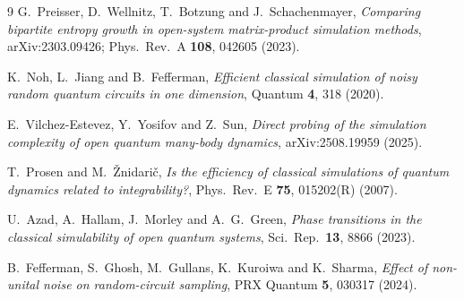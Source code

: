\documentclass[11pt,a4paper]{article}
\begin{document}
\begin{thebibliography}{9}
\small
{}
G.~Preisser, D.~Wellnitz, T.~Botzung and J.~Schachenmayer,
\emph{Comparing bipartite entropy growth in open-system matrix-product
simulation methods}, arXiv:2303.09426; Phys.\ Rev.\ A \textbf{108}, 042605 (2023).

K.~Noh, L.~Jiang and B.~Fefferman,
\emph{Efficient classical simulation of noisy random quantum circuits in one
dimension}, Quantum \textbf{4}, 318 (2020).

E.~Vilchez-Estevez, Y.~Yosifov and Z.~Sun,
\emph{Direct probing of the simulation complexity of open quantum many-body
dynamics}, arXiv:2508.19959 (2025).

T.~Prosen and M.~\v{Z}nidari\v{c},
\emph{Is the efficiency of classical simulations of quantum dynamics related to
integrability?}, Phys.\ Rev.\ E \textbf{75}, 015202(R) (2007).

U.~Azad, A.~Hallam, J.~Morley and A.~G.~Green,
\emph{Phase transitions in the classical simulability of open quantum systems},
Sci.\ Rep.\ \textbf{13}, 8866 (2023).

B.~Fefferman, S.~Ghosh, M.~Gullans, K.~Kuroiwa and K.~Sharma,
\emph{Effect of non-unital noise on random-circuit sampling},
PRX Quantum \textbf{5}, 030317 (2024).
\end{thebibliography}
\end{document}
